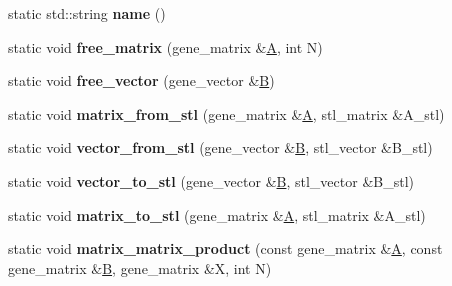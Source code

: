 \begin{DoxyCompactItemize}
\item 
\mbox{\label{classblitz__interface_a8b0112aaef84c3fcd8c54666b12744b4}} 
static std\+::string {\bfseries name} ()
\item 
\mbox{\label{classblitz__interface_a6acfa1927d115d1dee3321d7d20750f6}} 
static void {\bfseries free\+\_\+matrix} (gene\+\_\+matrix \&\hyperlink{group___core___module_class_eigen_1_1_matrix}{A}, int N)
\item 
\mbox{\label{classblitz__interface_a3e1d5fbd89956497407996500c08b997}} 
static void {\bfseries free\+\_\+vector} (gene\+\_\+vector \&\hyperlink{group___core___module_class_eigen_1_1_matrix}{B})
\item 
\mbox{\label{classblitz__interface_a1b7993acbb17ef8e3735f3eb0df1ef9a}} 
static void {\bfseries matrix\+\_\+from\+\_\+stl} (gene\+\_\+matrix \&\hyperlink{group___core___module_class_eigen_1_1_matrix}{A}, stl\+\_\+matrix \&A\+\_\+stl)
\item 
\mbox{\label{classblitz__interface_a45daaf20a09348ae29eb82f09e39da0b}} 
static void {\bfseries vector\+\_\+from\+\_\+stl} (gene\+\_\+vector \&\hyperlink{group___core___module_class_eigen_1_1_matrix}{B}, stl\+\_\+vector \&B\+\_\+stl)
\item 
\mbox{\label{classblitz__interface_a81033396864ea2ff2832a872adbaff77}} 
static void {\bfseries vector\+\_\+to\+\_\+stl} (gene\+\_\+vector \&\hyperlink{group___core___module_class_eigen_1_1_matrix}{B}, stl\+\_\+vector \&B\+\_\+stl)
\item 
\mbox{\label{classblitz__interface_a7aac6f5a1a33cfede0a6fa024cd1c2b1}} 
static void {\bfseries matrix\+\_\+to\+\_\+stl} (gene\+\_\+matrix \&\hyperlink{group___core___module_class_eigen_1_1_matrix}{A}, stl\+\_\+matrix \&A\+\_\+stl)
\item 
\mbox{\label{classblitz__interface_ab49ec7669bb97387a962bee716cd0d8a}} 
static void {\bfseries matrix\+\_\+matrix\+\_\+product} (const gene\+\_\+matrix \&\hyperlink{group___core___module_class_eigen_1_1_matrix}{A}, const gene\+\_\+matrix \&\hyperlink{group___core___module_class_eigen_1_1_matrix}{B}, gene\+\_\+matrix \&X, int N)

\end{DoxyCompactItemize}
